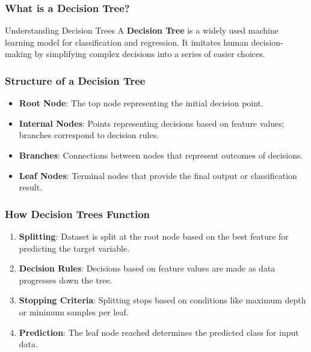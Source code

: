 \documentclass[aspectratio=169]{beamer}
\begin{document}
\begin{frame}[fragile]
    \frametitle{What is a Decision Tree?}
    \begin{block}{Understanding Decision Trees}
        A \textbf{Decision Tree} is a widely used machine learning model for classification and regression. 
        It imitates human decision-making by simplifying complex decisions into a series of easier choices.
    \end{block}
\end{frame}

\begin{frame}[fragile]
    \frametitle{Structure of a Decision Tree}
    \begin{itemize}
        \item \textbf{Root Node}: The top node representing the initial decision point.
        \item \textbf{Internal Nodes}: Points representing decisions based on feature values; branches correspond to decision rules.
        \item \textbf{Branches}: Connections between nodes that represent outcomes of decisions.
        \item \textbf{Leaf Nodes}: Terminal nodes that provide the final output or classification result.
    \end{itemize}
\end{frame}

\begin{frame}[fragile]
    \frametitle{How Decision Trees Function}
    \begin{enumerate}
        \item \textbf{Splitting}: Dataset is split at the root node based on the best feature for predicting the target variable.
        \item \textbf{Decision Rules}: Decisions based on feature values are made as data progresses down the tree.
        \item \textbf{Stopping Criteria}: Splitting stops based on conditions like maximum depth or minimum samples per leaf.
        \item \textbf{Prediction}: The leaf node reached determines the predicted class for input data.
    \end{enumerate}
\end{frame}
\end{document}
